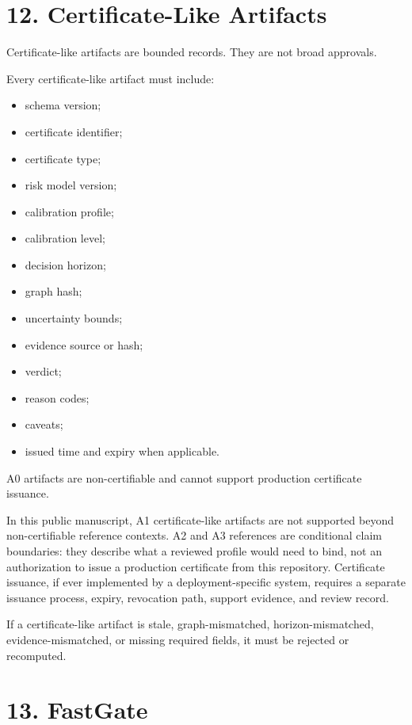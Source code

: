 \documentclass[
  american,
  a4paper,
  10pt]{article}
\providecommand{\tightlist}{%
  \setlength{\itemsep}{0pt}\setlength{\parskip}{0pt}}
\begin{document}
\section{12. Certificate-Like Artifacts}\label{12-certificate-like-artifacts}

Certificate-like artifacts are bounded records. They are not broad approvals.

Every certificate-like artifact must include:

\begin{itemize}
\tightlist
\item
  schema version;
\item
  certificate identifier;
\item
  certificate type;
\item
  risk model version;
\item
  calibration profile;
\item
  calibration level;
\item
  decision horizon;
\item
  graph hash;
\item
  uncertainty bounds;
\item
  evidence source or hash;
\item
  verdict;
\item
  reason codes;
\item
  caveats;
\item
  issued time and expiry when applicable.
\end{itemize}

A0 artifacts are non-certifiable and cannot support production certificate issuance.

In this public manuscript, A1 certificate-like artifacts are not supported beyond
non-certifiable reference contexts. A2 and A3 references are conditional claim
boundaries: they describe what a reviewed profile would need to bind, not an
authorization to issue a production certificate from this repository. Certificate
issuance, if ever implemented by a deployment-specific system, requires a separate
issuance process, expiry, revocation path, support evidence, and review record.

If a certificate-like artifact is stale, graph-mismatched, horizon-mismatched,
evidence-mismatched, or missing required fields, it must be rejected or recomputed.

\section{13. FastGate}\label{13-fastgate}
\end{document}
